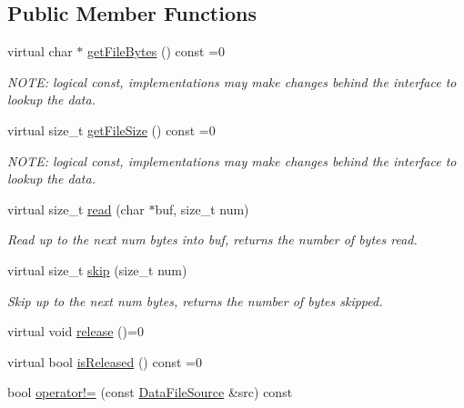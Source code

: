\subsection*{Public Member Functions}
\begin{DoxyCompactItemize}
\item 
virtual char $\ast$ \hyperlink{classBUSBOY_1_1DataFileSource_ada5ea0b760f3cf5a865197d3fb9e4fcd}{getFileBytes} () const =0
\begin{DoxyCompactList}\small\item\em NOTE: logical const, implementations may make changes behind the interface to lookup the data. \item\end{DoxyCompactList}\item 
virtual size\_\-t \hyperlink{classBUSBOY_1_1DataFileSource_a79ad2660b524ee38093b7cc72d2924f5}{getFileSize} () const =0
\begin{DoxyCompactList}\small\item\em NOTE: logical const, implementations may make changes behind the interface to lookup the data. \item\end{DoxyCompactList}\item 
virtual size\_\-t \hyperlink{classBUSBOY_1_1DataFileSource_a7466bffda1100fb6f330382b4e491dd6}{read} (char $\ast$buf, size\_\-t num)
\begin{DoxyCompactList}\small\item\em Read up to the next num bytes into buf, returns the number of bytes read. \item\end{DoxyCompactList}\item 
virtual size\_\-t \hyperlink{classBUSBOY_1_1DataFileSource_ab50fe5821ccaa51a26b65debe8fd1c84}{skip} (size\_\-t num)
\begin{DoxyCompactList}\small\item\em Skip up to the next num bytes, returns the number of bytes skipped. \item\end{DoxyCompactList}\item 
virtual void \hyperlink{classBUSBOY_1_1DataFileSource_a9f78f31eddcf41fd393e99ee00278d09}{release} ()=0
\item 
virtual bool \hyperlink{classBUSBOY_1_1DataFileSource_afd39ef6968c00cc9202c01d68bc87709}{isReleased} () const =0
\item 
bool \hyperlink{classBUSBOY_1_1DataFileSource_a1b9e815923b2d12c493aba58c7aacef7}{operator!=} (const \hyperlink{classBUSBOY_1_1DataFileSource}{DataFileSource} \&src) const 
\end{DoxyCompactItemize}


